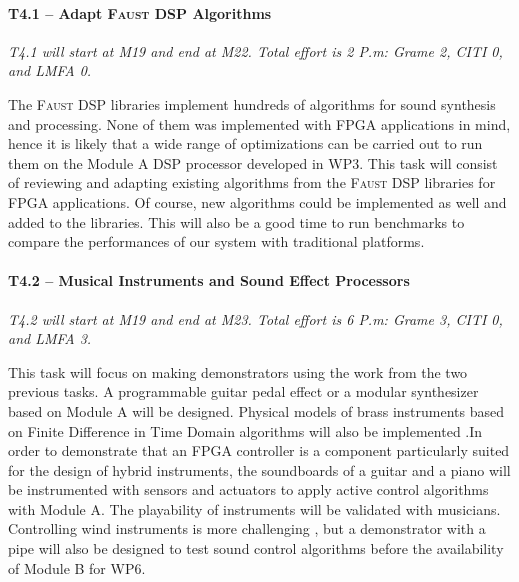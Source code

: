\documentclass[a4paper,9pt]{extarticle}
\newcommand{\F}{\textsc{Faust}}
\begin{document}
\paragraph{T4.1 -- Adapt \F{} DSP Algorithms}

\textit{T4.1 will start at M19 and end at M22. Total effort is 2 P.m: Grame 2, CITI 0, and LMFA 0.}

The \F{} DSP libraries \cite{Michon2017b} implement hundreds of algorithms for sound synthesis and processing. None of them was implemented with FPGA applications in mind, hence it is likely that a wide range of optimizations can be carried out to run them on the Module A DSP processor developed in WP3. This task will consist of reviewing and adapting existing algorithms from the \F{} DSP libraries for FPGA applications. Of course, new algorithms could be implemented as well and added to the libraries. This will also be a good time to run benchmarks to compare the performances of our system with traditional platforms.

\paragraph{T4.2 -- Musical Instruments and Sound Effect Processors}

\textit{T4.2 will start at M19 and end at M23. Total effort is 6 P.m: Grame 3, CITI 0, and LMFA 3.}

This task will focus on making demonstrators using the work from the two previous tasks. A programmable guitar pedal effect or a modular synthesizer based on Module A will be designed. Physical models of brass instruments based on Finite Difference in Time Domain algorithms will also be implemented \cite{Bilbao2009}.In order to demonstrate that an FPGA controller is a component particularly suited for the design of hybrid instruments, the soundboards of a guitar and a piano will be instrumented with sensors and actuators to apply active control algorithms with Module A. The playability of instruments will be validated with musicians. Controlling wind instruments is more challenging \cite{meurisse2015experimental}, but a demonstrator with a pipe will also be designed to test sound control algorithms before the  availability of Module B for WP6. 
\end{document}
